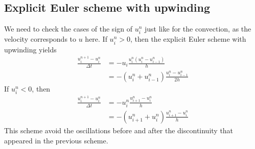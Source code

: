 \documentclass[12pt, openany]{report}
\theoremstyle{definition}
\begin{document}
\subsection{Explicit Euler scheme with upwinding}
We need to check the cases of the sign of $u_i^n$ just like for the convection, as the velocity corresponds to $u$ here. 
If $u_i^n>0$, then the explicit Euler scheme with upwinding yields 
\begin{equation}
	\begin{aligned}
		\frac{u_i^{n+1}-u_i^n}{\Delta t} &= -u_i \frac{u_i^n(u_i^n - u_{i-1}^n)}{h}\\
		&= -(u_i^n + u_{i-1}^n)\frac{u_i^n - u_{i-1}^n}{2h}
	\end{aligned}
\end{equation}
If $u_i^n<0$, then 
\begin{equation}
	\begin{aligned}
		\frac{u_i^{n+1}-u_i^n}{\Delta t} &= -u_i^n\frac{u_{i+1}^n - u_i^n}{h} \\
		&= -(u_{i+1}^n + u_i^n) \frac{u_{i+1}^n-u_i^n}{h}
	\end{aligned}
\end{equation}
This scheme avoid the oscillations before and after the discontinuity that appeared in the previous scheme. 
\end{document}
